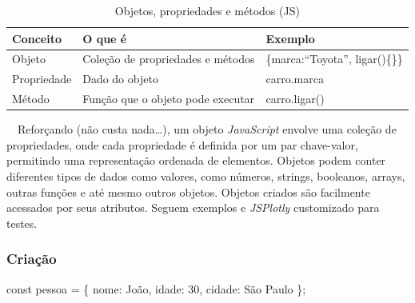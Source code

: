 \documentclass[
  portuguese,
  letterpaper,
  DIV=11,
  numbers=noendperiod]{scrreprt}
\newenvironment{Shaded}{\begin{snugshade}}{\end{snugshade}}
\newcommand{\DecValTok}[1]{\textcolor[rgb]{0.68,0.00,0.00}{#1}}
\newcommand{\NormalTok}[1]{\textcolor[rgb]{0.00,0.23,0.31}{#1}}
\newcommand{\OtherTok}[1]{\textcolor[rgb]{0.00,0.23,0.31}{#1}}
\newcommand{\SpecialCharTok}[1]{\textcolor[rgb]{0.37,0.37,0.37}{#1}}
\newcommand{\StringTok}[1]{\textcolor[rgb]{0.13,0.47,0.30}{#1}}
\begin{document}
\begin{longtable}[]{@{}
  >{\raggedright\arraybackslash}p{}
  >{\raggedright\arraybackslash}p{}
  >{\raggedright\arraybackslash}p{}@{}}

\caption{\label{tbl-objetos-js}Objetos, propriedades e métodos (JS)}

\tabularnewline

\toprule\noalign{}
\begin{minipage}[b]{\linewidth}\raggedright
Conceito
\end{minipage} & \begin{minipage}[b]{\linewidth}\raggedright
O que é
\end{minipage} & \begin{minipage}[b]{\linewidth}\raggedright
Exemplo
\end{minipage} \\
\midrule\noalign{}
\endhead
\bottomrule\noalign{}
\endlastfoot
Objeto & Coleção de propriedades e métodos & \{marca:``Toyota'',
ligar()\{\}\} \\
Propriedade & Dado do objeto & carro.marca \\
Método & Função que o objeto pode executar & carro.ligar() \\

\end{longtable}

\hfill\break

~~Reforçando (não custa nada\ldots), um objeto \emph{JavaScript} envolve
uma coleção de propriedades, onde cada propriedade é definida por um par
chave-valor, permitindo uma representação ordenada de elementos. Objetos
podem conter diferentes tipos de dados como valores, como números,
strings, booleanos, arrays, outras funções e até mesmo outros objetos.
Objetos criados são facilmente acessados por seus atributos. Seguem
exemplos e \emph{JSPlotly} customizado para testes.

\subsubsection{Criação}\label{criauxe7uxe3o-1}

\begin{Shaded}
\begin{Highlighting}[]
\NormalTok{const pessoa }\OtherTok{=}\NormalTok{ \{}
\NormalTok{    nome}\SpecialCharTok{:} \StringTok{\textquotesingle{}João\textquotesingle{}}\NormalTok{,}
\NormalTok{    idade}\SpecialCharTok{:} \DecValTok{30}\NormalTok{,}
\NormalTok{    cidade}\SpecialCharTok{:} \StringTok{\textquotesingle{}São Paulo\textquotesingle{}}
\NormalTok{\};}
\end{Highlighting}
\end{Shaded}
\end{document}
